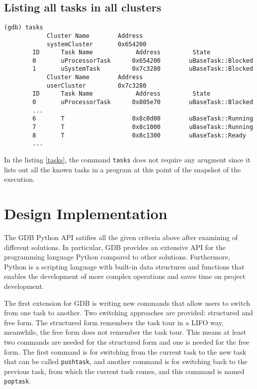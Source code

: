 \subsection{Listing all tasks in all clusters}
\begin{lstlisting}[caption={\text{tasks} command}, label={tasks}]
(gdb) tasks
            Cluster Name        Address
            systemCluster       0x654200
        ID      Task Name            Address         State
        0       uProcessorTask      0x654200        uBaseTask::Blocked
        1       uSystemTask         0x7c3280        uBaseTask::Blocked
            Cluster Name        Address
            userCluster         0x7c3280
        ID      Task Name            Address         State
        0       uProcessorTask      0x805e70        uBaseTask::Blocked
        ...
        6       T                   0x8c0d00        uBaseTask::Running
        7       T                   0x8c1000        uBaseTask::Running
        8       T                   0x8c1300        uBaseTask::Ready
        ...
\end{lstlisting}
In the listing \ref{tasks}, the command \verb|tasks| does not require any
arugment since it lists out all the known tasks in a \uCPPS program at this
point of the snapshot of the execution.

\section{Design Implementation}
The GDB Python API satifies all the given criteria above after examining of different solutions. In particular, GDB provides an extensive API for
the programming language Python compared to other solutions. Furthermore, Python is a scripting language with built-in
data structures and functions that enables the development of more complex
operations and saves time on project development.

The first extension for GDB is writing new commands that allow
users to switch from one \uCCS task to another. Two switching approaches are
provided: structured and free form. The structured form remembers the task tour in a
LIFO way, meanwhile, the free form does not remember the task tour. This means
at least two commands are needed for the structured form and one is needed for
the free form. The first command is for switching from the current task to
the new task that can be called \verb|pushtask|, and another command
is for switching back to the previous task, from which the current task comes, and this command is named \verb|poptask|.

